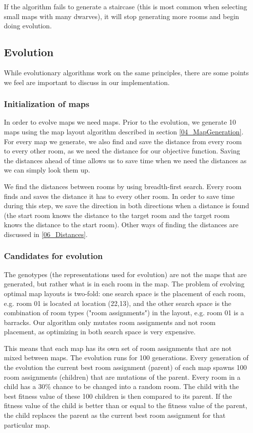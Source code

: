 If the algorithm fails to generate a staircase (this is most common when selecting small maps with many dwarves), it will stop generating more rooms and begin doing evolution.

\subsection{Evolution}
\label{04_Evolution}
While evolutionary algorithms work on the same principles, there are some points we feel are important to discuss in our implementation.

\subsubsection{Initialization of maps}
\label{04_Evolution_Initialization}
In order to evolve maps we need maps. Prior to the evolution, we generate 10 maps using the map layout algorithm described in section \ref{04_MapGeneration}. For every map we generate, we also find and save the distance from every room to every other room, as we need the distance for our objective function. Saving the distances ahead of time allows us to save time when we need the distances as we can simply look them up.

We find the distances between rooms by using breadth-first search\cite{sedgewick4th}\cite{ucibfs}. Every room finds and saves the distance it has to every other room. In order to save time during this step, we save the direction in both directions when a distance is found (the start room knows the distance to the target room and the target room knows the distance to the start room). Other ways of finding the distances are discussed in \ref{06_Distances}.

\subsubsection{Candidates for evolution}
The genotypes (the representations used for evolution) are not the maps that are generated, but rather what is in each room in the map. The problem of evolving optimal map layouts is two-fold: one search space is the placement of each room, e.g. room 01 is located at location (22,13), and the other search space is the combination of room types ("room assignments") in the layout, e.g. room 01 is a barracks. Our algorithm only mutates room assignments and not room placement, as optimizing in both search space is very expensive. 

This means that each map has its own set of room assignments that are not mixed between maps. The evolution runs for 100 generations. Every generation of the evolution the current best room assignment (parent) of each map spawns 100 room assignments (children) that are mutations of the parent. Every room in a child has a 30\% chance to be changed into a random room. The child with the best fitness value of these 100 children is then compared to its parent. If the fitness value of the child is better than or equal to the fitness value of the parent, the child replaces the parent as the current best room assignment for that particular map.  

